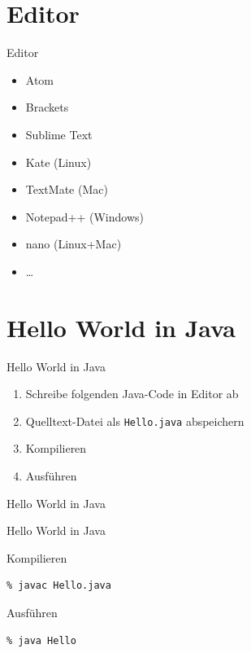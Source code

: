 \documentclass[18pt]{beamer}
\begin{document}
\section{Editor}

\begin{frame}{Editor}
    \begin{itemize}
        \pause
        \item Atom
        \pause
        \item Brackets
        \pause
        \item Sublime Text
        \pause
        \item Kate (Linux)
        \pause
        \item TextMate (Mac)
        \pause
        \item Notepad++ (Windows)
        \pause
        \item nano (Linux+Mac)
        \pause
        \item \dots
    \end{itemize}
\end{frame}

\section{Hello World in Java}

\begin{frame}{Hello World in Java}
    \begin{enumerate}
        \item Schreibe folgenden Java-Code in Editor ab
        \item Quelltext-Datei als \texttt{Hello.java} abspeichern
        \item Kompilieren
        \item Ausführen
    \end{enumerate}
\end{frame}

\begin{frame}{Hello World in Java}
    
\end{frame}

\begin{frame}[fragile]{Hello World in Java}
    \begin{block}{Kompilieren}
        \begin{lstlisting}
% javac Hello.java
        \end{lstlisting}
    \end{block}
    \pause
    \begin{block}{Ausführen}
        \begin{lstlisting}
% java Hello
        \end{lstlisting}
    \end{block}
\end{frame}
\end{document}
